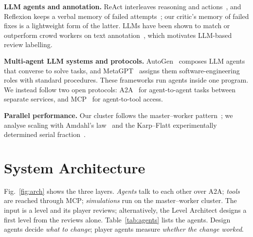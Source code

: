 \documentclass[conference]{IEEEtran}
\begin{document}
\textbf{LLM agents and annotation.} ReAct interleaves reasoning and actions~\cite{yao2023react}, and
Reflexion keeps a verbal memory of failed attempts~\cite{shinn2023reflexion}; our critic's memory of
failed fixes is a lightweight form of the latter. LLMs have been shown to match or outperform crowd
workers on text annotation~\cite{gilardi2023annotation}, which motivates LLM-based review labelling.

\textbf{Multi-agent LLM systems and protocols.} AutoGen~\cite{wu2023autogen} composes LLM agents
that converse to solve tasks, and MetaGPT~\cite{hong2024metagpt} assigns them software-engineering
roles with standard procedures. These frameworks run agents inside one program. We instead follow
two open protocols: A2A~\cite{a2aspec} for agent-to-agent tasks between separate services, and
MCP~\cite{mcpspec} for agent-to-tool access.

\textbf{Parallel performance.} Our cluster follows the master--worker pattern~\cite{mattson2004patterns};
we analyse scaling with Amdahl's law~\cite{amdahl1967} and the Karp--Flatt experimentally
determined serial fraction~\cite{karpflatt1990}.

\section{System Architecture}
Fig.~\ref{fig:arch} shows the three layers. \emph{Agents} talk to each other over A2A;
\emph{tools} are reached through MCP; \emph{simulations} run on the master--worker cluster. The input
is a level and its player reviews; alternatively, the Level Architect designs a first level from the
reviews alone. Table~\ref{tab:agents} lists the agents. Design agents decide \emph{what to change};
player agents measure \emph{whether the change worked}.
\end{document}
